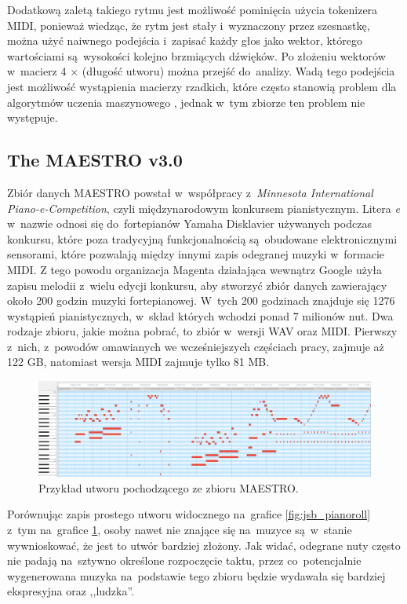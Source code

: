 \documentclass[data-science]{agh-wi} %
\begin{document}
Dodatkową zaletą takiego rytmu jest możliwość pominięcia użycia tokenizera MIDI, ponieważ wiedząc, że rytm jest stały i~wyznaczony przez szesnastkę, można użyć naiwnego podejścia i~zapisać każdy głos jako wektor, którego wartościami są~wysokości kolejno brzmiących dźwięków. Po złożeniu wektorów w~macierz 4 $\times$ (długość utworu) można przejść do~analizy. Wadą tego podejścia jest możliwość wystąpienia macierzy rzadkich, które często stanowią problem dla algorytmów uczenia maszynowego \cite*{sparse_matrix}, jednak w~tym zbiorze ten problem nie występuje.

\subsection{The MAESTRO v3.0}
Zbiór danych MAESTRO \cite{maestrov3} powstał w~współpracy z~\textit{Minnesota International Piano-e-Competition}, czyli międzynarodowym konkursem pianistycznym. Litera \textit{e} w~nazwie odnosi się do~fortepianów Yamaha Disklavier używanych podczas konkursu, które poza tradycyjną funkcjonalnością są~obudowane elektronicznymi sensorami, które pozwalają między innymi zapis odegranej muzyki w~formacie MIDI. Z tego powodu organizacja Magenta działająca wewnątrz Google użyła zapisu melodii z~wielu edycji konkursu, aby stworzyć zbiór danych zawierający około 200 godzin muzyki fortepianowej. W~tych 200 godzinach znajduje się 1276 wystąpień pianistycznych, w~skład których wchodzi ponad 7 milionów nut. Dwa rodzaje zbioru, jakie można pobrać, to zbiór w~wersji WAV oraz MIDI. Pierwszy z~nich, z~powodów omawianych we wcześniejszych częściach pracy, zajmuje aż 122 GB, natomiast wersja MIDI zajmuje tylko 81 MB.
\begin{figure}[ht!]
    \begin{center}
        \includegraphics[width=0.9\linewidth]{./img/maestro_1.png}
    \end{center}
    \caption{{Przykład utworu pochodzącego ze zbioru MAESTRO.}}\label{fig:maestro_midi}
\end{figure}

Porównując zapis prostego utworu widocznego na~grafice \ref*{fig:jsb_pianoroll} z~tym na~grafice \ref*{fig:maestro_midi}, osoby nawet nie znające się na~muzyce są~w~stanie wywnioskować, że jest to utwór bardziej złożony. Jak widać, odegrane nuty często nie padają na~sztywno określone rozpoczęcie taktu, przez co~potencjalnie wygenerowana muzyka na~podstawie tego zbioru będzie wydawała się bardziej ekspresyjna oraz ,,ludzka''.
\end{document}
